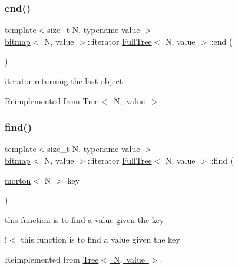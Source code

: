 \mbox{\label{classFullTree_a692131b057639fecdb1934b734cff1bb}} 
\subsubsection{\texorpdfstring{end()}{end()}}
{\footnotesize\ttfamily template$<$size\+\_\+t N, typename value $>$ \\
\mbox{\hyperlink{definitions_8h_acf2396ef4de9eb8a6324b9f1a624ea85}{bitmap}}$<$ N, value $>$\+::iterator \mbox{\hyperlink{classFullTree}{Full\+Tree}}$<$ N, value $>$\+::end (\begin{DoxyParamCaption}{ }\end{DoxyParamCaption})\hspace{0.3cm}{\ttfamily [virtual]}}

iterator returning the last object 

Reimplemented from \mbox{\hyperlink{classTree_a780c144c3fa4f648e7c616d7010721b0}{Tree$<$ N, value $>$}}.

\mbox{\label{classFullTree_ad0432afb277be83e79d33e1a748648a3}} 
\subsubsection{\texorpdfstring{find()}{find()}}
{\footnotesize\ttfamily template$<$size\+\_\+t N, typename value $>$ \\
\mbox{\hyperlink{definitions_8h_acf2396ef4de9eb8a6324b9f1a624ea85}{bitmap}}$<$ N, value $>$\+::iterator \mbox{\hyperlink{classFullTree}{Full\+Tree}}$<$ N, value $>$\+::find (\begin{DoxyParamCaption}\item[{\mbox{\hyperlink{definitions_8h_af8682350bd8bb38ee9023f7a0a310add}{morton}}$<$ N $>$}]{key }\end{DoxyParamCaption})\hspace{0.3cm}{\ttfamily [virtual]}}

this function is to find a value given the key

!$<$ this function is to find a value given the key 

Reimplemented from \mbox{\hyperlink{classTree_a8337d6639f90ef96e4d42e1cbfab61dd}{Tree$<$ N, value $>$}}.

\mbox{\label{classFullTree_ae820d50b6b006f8bcdbcbcc5aa2fc9f6}} 
